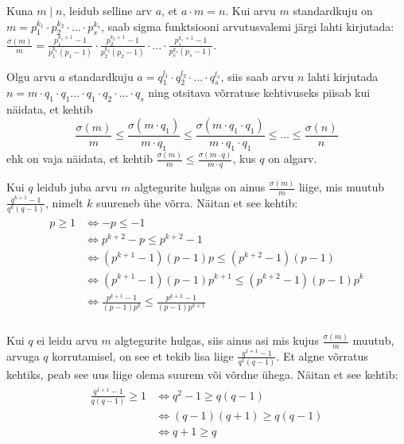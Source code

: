 \documentclass[a4paper, 10pt]{article}
\begin{document}
\bigskip
Kuna $m\mid n$, leidub selline arv $a$, et $a\cdot m=n$. Kui arvu $m$ standardkuju on $m=p_1^{k_1}\cdot p_2^{k_2}\cdot...\cdot p_s^{k_s}$, saab sigma funktsiooni arvutusvalemi järgi lahti kirjutada: $\frac{\sigma(m)}m=\frac{p_1^{k_1+1}-1}{p_1^{k_1}(p_1-1)}\cdot\frac{p_2^{k_2+1}-1}{p_2^{k_2}(p_2-1)}\cdot...\cdot\frac{p_s^{k_s+1}-1}{p_s^{k_s}(p_s-1)}$.

Olgu arvu $a$ standardkuju $a=q_1^{l_1}\cdot q_2^{l_2}\cdot...\cdot q_s^{l_s}$, siis saab arvu $n$ lahti kirjutada $n=m\cdot q_1\cdot q_1...\cdot q_1\cdot q_2\cdot ... \cdot q_s$ ning otsitava võrratuse kehtivuseks piisab kui näidata, et kehtib $$\frac{\sigma(m)}{m}\leq\frac{\sigma(m\cdot q_1)}{m\cdot q_1}\leq\frac{\sigma(m\cdot q_1\cdot q_1)}{m\cdot q_1\cdot q_1}\leq ...\leq\frac{\sigma(n)}{n}$$ ehk on vaja näidata, et kehtib $\frac{\sigma(m)}{m}\leq\frac{\sigma(m\cdot q)}{m\cdot q}$, kus $q$ on algarv.

Kui $q$ leidub juba arvu $m$ algtegurite hulgas on ainus $\frac{\sigma(m)}{m}$ liige, mis muutub $\frac{q^{k+1}-1}{q^{k}(q-1)}$, nimelt $k$ suureneb ühe võrra. Näitan et see kehtib: 
\begin{gather*}
\begin{aligned}
p\geq1&\Leftrightarrow-p\leq-1\\
&\Leftrightarrow p^{k+2}-p\leq p^{k+2}-1\\
&\Leftrightarrow (p^{k+1}-1)(p-1)p\leq (p^{k+2}-1)(p-1)\\
&\Leftrightarrow (p^{k+1}-1)(p-1)p^{k+1}\leq (p^{k+2}-1)(p-1)p^k\\
&\Leftrightarrow \frac{p^{k+1}-1}{(p-1)p^k}\leq \frac{p^{k+2}-1}{(p-1)p^{k+1}}\\
\end{aligned}
\end{gather*}
\bigskip

Kui $q$ ei leidu arvu $m$ algtegurite hulgas, siis ainus asi mis kujus $\frac{\sigma(m)}{m}$ muutub, arvuga $q$ korrutamisel, on see et tekib lisa liige $\frac{q^{1+1}-1}{q^{1}(q-1)}$. Et algne võrratus kehtiks, peab see uus liige olema suurem või võrdne ühega. Näitan et see kehtib:
\begin{gather*}
\begin{aligned}
\frac{q^{1+1}-1}{q(q-1)}\geq 1&\Leftrightarrow q^{2}-1\geq q(q-1)\\
&\Leftrightarrow (q-1)(q+1)\geq q(q-1)\\
&\Leftrightarrow q+1\geq q\\
\end{aligned}
\end{gather*}
\bigskip
\end{document}

